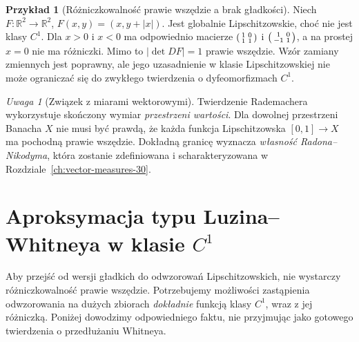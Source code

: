 \documentclass[11pt,a4paper,oneside]{book}
\numberwithin{equation}{chapter}
\theoremstyle{plain}
\theoremstyle{definition}
\newtheorem{przyklad}[twierdzenie]{Przykład}
\theoremstyle{remark}
\newtheorem{uwaga}[twierdzenie]{Uwaga}
\begin{document}
\begin{przyklad}[Różniczkowalność prawie wszędzie a brak gładkości]
Niech $F:\mathbb R^2\to\mathbb R^2$,
$F(x,y)=(x,y+|x|)$. Jest globalnie Lipschitzowskie,
choć nie jest klasy $C^1$. Dla $x>0$ i $x<0$
ma odpowiednio macierze $\begin{psmallmatrix}1&0\\1&1\end{psmallmatrix}$
i $\begin{psmallmatrix}1&0\\-1&1\end{psmallmatrix}$,
a na prostej $x=0$ nie ma różniczki. Mimo to
$|\det DF|=1$ prawie wszędzie. Wzór zamiany
zmiennych jest poprawny, ale jego uzasadnienie
w klasie Lipschitzowskiej nie może ograniczać się
do zwykłego twierdzenia o dyfeomorfizmach $C^1$.
\end{przyklad}

\begin{uwaga}[Związek z miarami wektorowymi]
Twierdzenie Rademachera wykorzystuje skończony wymiar
\emph{przestrzeni wartości}. Dla dowolnej przestrzeni
Banacha $X$ nie musi być prawdą, że każda funkcja
Lipschitzowska $[0,1]\to X$ ma pochodną prawie wszędzie.
Dokładną granicę wyznacza \emph{własność Radona--Nikodyma},
która zostanie zdefiniowana i scharakteryzowana w
Rozdziale~\ref{ch:vector-measures-30}.
\end{uwaga}

\section{Aproksymacja typu Luzina--Whitneya w klasie $C^1$}
Aby przejść od wersji gładkich do odwzorowań Lipschitzowskich,
nie wystarczy różniczkowalność prawie wszędzie. Potrzebujemy
możliwości zastąpienia odwzorowania na dużych zbiorach
\emph{dokładnie} funkcją klasy $C^1$, wraz z jej różniczką.
Poniżej dowodzimy odpowiedniego faktu, nie przyjmując
jako gotowego twierdzenia o przedłużaniu Whitneya.
\end{document}
